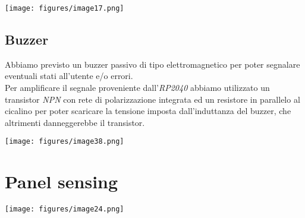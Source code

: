 \begin{center}
\texttt{[image: figures/image17.png]}
\captionsetup{type=figure}
\end{center}

\hypertarget{buzzer}{%
\subsection{\texorpdfstring{Buzzer}{Buzzer}}\label{buzzer}}

Abbiamo previsto un buzzer passivo di tipo elettromagnetico per poter
segnalare eventuali stati all'utente e/o errori.\\
Per amplificare il segnale proveniente dall'\textit{RP2040} abbiamo utilizzato un transistor \textit{NPN} con
rete di polarizzazione integrata ed un resistore in parallelo al
cicalino per poter scaricare la tensione imposta dall'induttanza del
buzzer, che altrimenti danneggerebbe il transistor.

\begin{center}
\texttt{[image: figures/image38.png]}
\captionsetup{type=figure}
\end{center}

\hypertarget{panel-sensing}{%
\section{\texorpdfstring{Panel sensing}{ Panel sensing}}\label{panel-sensing}}

\begin{center}
\texttt{[image: figures/image24.png]}
\captionsetup{type=figure}
\end{center}

